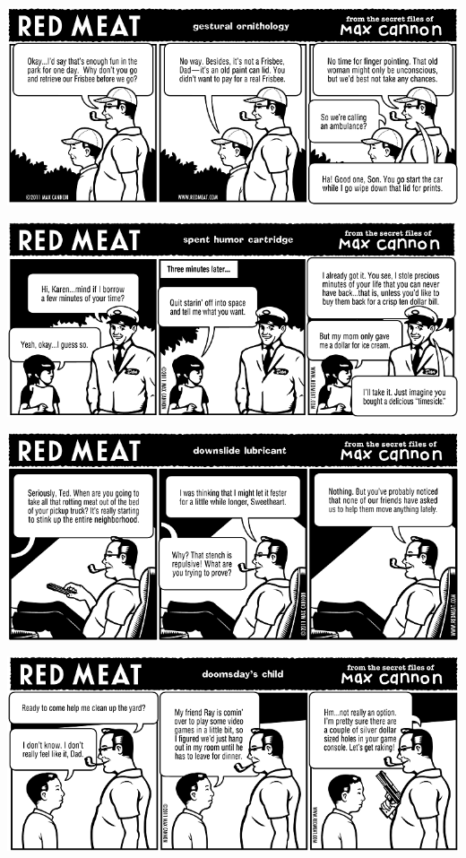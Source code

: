 \documentclass[a4paper,twoside,11pt]{article}
\begin{document}
\includegraphics[width=\textwidth]{redmeat_2011-08-23.png}



\includegraphics[width=\textwidth]{redmeat_2011-08-30.png}



\includegraphics[width=\textwidth]{redmeat_2011-09-06.png}



\includegraphics[width=\textwidth]{redmeat_2011-09-13.png}
\end{document}
